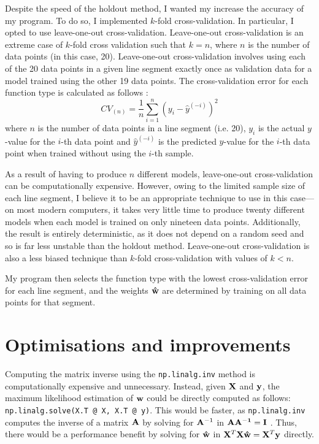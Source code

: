 \documentclass[onecolumn, 12pt, a4paper]{article}
\begin{document}
Despite the speed of the holdout method, I wanted my increase the accuracy
of my program.
To do so, I implemented $k$-fold cross-validation.
In particular, I opted to use leave-one-out cross-validation.
Leave-one-out cross-validation is 
an extreme case of $k$-fold cross validation
such that $k = n$, where
$n$ is the number of data points (in this case, 20).
Leave-one-out cross-validation involves using each of
the 20 data points in a given line segment exactly once as validation data for a model
trained using the other 19 data points. 
The cross-validation error for each function type is calculated
as follows \cite{Stanford}:
\[
    CV_{(n)} = \frac{1}{n} \sum_{i = 1}^{n} (y_{i} - \hat{y}^{(-i)})^{2}
\]
where
$n$ is the number of data points in a line segment (i.e. 20),
$y_{i}$ is the actual $y$-value for the $i$-th data point
and $\hat{y}^{(-i)}$ is the predicted $y$-value for the $i$-th
data point when trained without using the $i$-th sample.

As a result of having to produce $n$ different models,
leave-one-out cross-validation can be computationally expensive.
However, owing to the limited sample size of each line segment,
I believe it to be an appropriate technique to use in this case---on
most modern computers, it takes very little time
to produce twenty different models when each model is trained
on only nineteen data points.
Additionally, the result is entirely deterministic, as it does not depend
on a random seed and so is far less unstable than the holdout method.
Leave-one-out cross-validation is also a less biased technique
than $k$-fold cross-validation with values of $k < n$.

My program then selects the function type with the lowest
cross-validation error for each line segment,
and the weights $\vb{\hat{w}}$ are determined by training on all
data points for that segment.

\section{Optimisations and improvements}

Computing the matrix inverse using the \texttt{np.linalg.inv}
method is computationally expensive and unnecessary.
Instead, given $\vb{X}$ and $\vb{y}$, the maximum likelihood
estimation of $\vb{w}$ could be directly computed as follows:
\texttt{np.linalg.solve(X.T @ X, X.T @ y)}.
This would be faster, as \texttt{np.linalg.inv}
computes the inverse of a matrix $\vb{A}$ by solving for $\vb{A}^{-1}$
in $\vb{AA^{-1} = I}$ \cite{StackOverflow}.
Thus, there would be a performance benefit by solving for
$\vb{\hat{w}}$ in
$\vb{X}^{T} \vb{X} \vb{\hat{w}} = \vb{X}^{T} \vb{y}$ directly.
\end{document}
